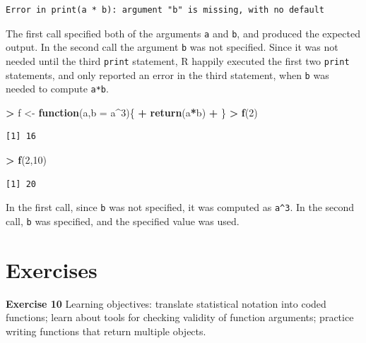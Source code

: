 \documentclass[]{krantz}
\makeatletter
\newenvironment{Shaded}{\begin{snugshade}}{\end{snugshade}}
\newcommand{\KeywordTok}[1]{\textcolor[rgb]{0.27,0.27,0.27}{\textbf{#1}}}
\newcommand{\DataTypeTok}[1]{\textcolor[rgb]{0.27,0.27,0.27}{#1}}
\newcommand{\DecValTok}[1]{\textcolor[rgb]{0.06,0.06,0.06}{#1}}
\newcommand{\StringTok}[1]{\textcolor[rgb]{0.5,0.5,0.5}{#1}}
\newcommand{\ControlFlowTok}[1]{\textcolor[rgb]{0.27,0.27,0.27}{\textbf{#1}}}
\newcommand{\OperatorTok}[1]{\textcolor[rgb]{0.43,0.43,0.43}{\textbf{#1}}}
\newcommand{\NormalTok}[1]{#1}
\newenvironment{kframe}{%
\medskip{}
\setlength{\fboxsep}{.8em}
 \def\at@end@of@kframe{}%
 \ifinner\ifhmode%
  \def\at@end@of@kframe{\end{minipage}}%
  \begin{minipage}{\columnwidth}%
 \fi\fi%
 \def\FrameCommand##1{\hskip\@totalleftmargin \hskip-\fboxsep
 \colorbox{shadecolor}{##1}\hskip-\fboxsep
     \hskip-\linewidth \hskip-\@totalleftmargin \hskip\columnwidth}%
 \MakeFramed {\advance\hsize-\width
   \@totalleftmargin\z@ \linewidth\hsize
   \@setminipage}}%
 {\par\unskip\endMakeFramed%
 \at@end@of@kframe}
\renewenvironment{Shaded}{\begin{kframe}}{\end{kframe}}
\makeatother
\begin{document}
\begin{verbatim}
Error in print(a * b): argument "b" is missing, with no default
\end{verbatim}

The first call specified both of the arguments \texttt{a} and
\texttt{b}, and produced the expected output. In the second call the
argument \texttt{b} was not specified. Since it was not needed until the
third \texttt{print} statement, R happily executed the first two
\texttt{print} statements, and only reported an error in the third
statement, when \texttt{b} was needed to compute \texttt{a*b}.

\begin{Shaded}
\begin{Highlighting}[]
\OperatorTok{>}\StringTok{ }\NormalTok{f <-}\StringTok{ }\ControlFlowTok{function}\NormalTok{(a,}\DataTypeTok{b =}\NormalTok{ a}\OperatorTok{^}\DecValTok{3}\NormalTok{)\{}
\OperatorTok{+}\StringTok{     }\KeywordTok{return}\NormalTok{(a}\OperatorTok{*}\NormalTok{b)}
\OperatorTok{+}\StringTok{ }\NormalTok{\}}
\OperatorTok{>}\StringTok{ }\KeywordTok{f}\NormalTok{(}\DecValTok{2}\NormalTok{)}
\end{Highlighting}
\end{Shaded}

\begin{verbatim}
[1] 16
\end{verbatim}

\begin{Shaded}
\begin{Highlighting}[]
\OperatorTok{>}\StringTok{ }\KeywordTok{f}\NormalTok{(}\DecValTok{2}\NormalTok{,}\DecValTok{10}\NormalTok{)}
\end{Highlighting}
\end{Shaded}

\begin{verbatim}
[1] 20
\end{verbatim}

In the first call, since \texttt{b} was not specified, it was computed
as \texttt{a\^{}3}. In the second call, \texttt{b} was specified, and
the specified value was used.

\section{Exercises}\label{exercises-4}

\textbf{Exercise 10} Learning objectives: translate statistical notation
into coded functions; learn about tools for checking validity of
function arguments; practice writing functions that return multiple
objects.
\end{document}
